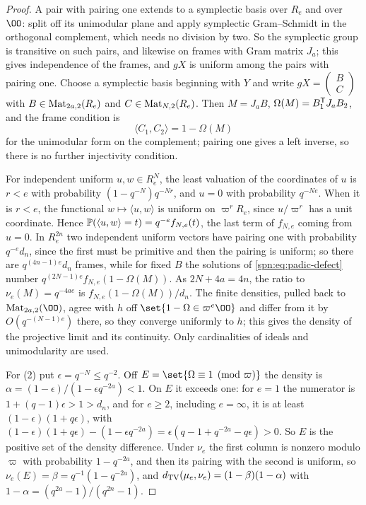 \begin{proof}
A pair with pairing one extends to a symplectic basis over $R_e$ and over $\OO$: split off its
unimodular plane and apply symplectic Gram--Schmidt in the orthogonal complement, which needs no
division by two. So the symplectic group is transitive on such pairs, and likewise on frames with
Gram matrix $J_a$; this gives independence of the frames, and $gX$ is uniform among the pairs
with pairing one. Choose a symplectic basis beginning with $Y$ and write
$gX=\left(\begin{smallmatrix}B\\C\end{smallmatrix}\right)$ with $B\in\operatorname{Mat}_{2a,2}(R_e)$ and
$C\in\operatorname{Mat}_{N,2}(R_e)$. Then $M=J_aB$, $\Omega(M)=B_1^{\mathsf{T}}J_aB_2$, and the frame condition
is
\begin{equation}\label{spn:eq:padic-defect}
 \langle C_1,C_2\rangle=1-\Omega(M)
\end{equation}
for the unimodular form on the complement; pairing one gives a left inverse, so there is no
further injectivity condition.

For independent uniform $u,w\in R_e^N$, the least valuation of the coordinates of $u$ is $r<e$
with probability $(1-q^{-N})q^{-Nr}$, and $u=0$ with probability $q^{-Ne}$. When it is $r<e$,
the functional $w\mapsto\langle u,w\rangle$ is uniform on $\varpi^rR_e$, since $u/\varpi^r$ has a
unit coordinate. Hence $\mathbb{P}(\langle u,w\rangle=t)=q^{-e}f_{N,e}(t)$, the last term of
$f_{N,e}$ coming from $u=0$. In $R_e^{2n}$ two independent uniform vectors have pairing one with
probability $q^{-e}d_n$, since the first must be primitive and then the pairing is uniform; so
there are $q^{(4n-1)e}d_n$ frames, while for fixed $B$ the solutions of
\eqref{spn:eq:padic-defect} number $q^{(2N-1)e}f_{N,e}(1-\Omega(M))$. As $2N+4a=4n$, the ratio
to $\nu_e(M)=q^{-4ae}$ is $f_{N,e}(1-\Omega(M))/d_n$. The finite densities, pulled back to
$\spnMat_{2a,2}(\OO)$, agree with $h$ off $\set{1-\Omega\in\varpi^e\OO}$ and differ from it by
$O(q^{-(N-1)e})$ there, so they converge uniformly to $h$; this gives the density of the
projective limit and its continuity. Only cardinalities of ideals and unimodularity are used.

For (2) put $\epsilon=q^{-N}\le q^{-2}$. Off $E=\set{\Omega\equiv1\pmod\varpi}$ the density is
$\alpha=(1-\epsilon)/(1-\epsilon q^{-2a})<1$. On $E$ it exceeds one: for $e=1$ the numerator is
$1+(q-1)\epsilon>1>d_n$, and for $e\ge2$, including $e=\infty$, it is at least
$(1-\epsilon)(1+q\epsilon)$, with
$(1-\epsilon)(1+q\epsilon)-(1-\epsilon q^{-2a})=\epsilon(q-1+q^{-2a}-q\epsilon)>0$. So $E$ is the
positive set of the density difference. Under $\nu_e$ the first column is nonzero modulo $\varpi$
with probability $1-q^{-2a}$, and then its pairing with the second is uniform, so
$\nu_e(E)=\beta=q^{-1}(1-q^{-2a})$, and $d_{\mathrm{TV}}(\mu_e,\nu_e)=(1-\beta)(1-\alpha)$ with
$1-\alpha=(q^{2a}-1)/(q^{2n}-1)$.


\end{proof}
